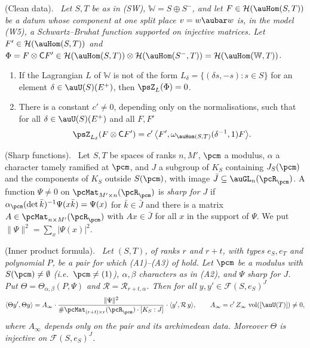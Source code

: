 \documentclass[10pt]{amsart}
\theoremstyle{definition}
\theoremstyle{remark}
\providecommand{\pcF}{\mathcal F}
\providecommand{\pcRal}{\mathcal R}
\providecommand{\pcW}{\mathbb W}
\providecommand{\pcvol}{\operatorname{vol}}
\providecommand{\psHS}{\mathcal H}
\newenvironment{quotedthm}[2]{\par\medskip\noindent\begingroup
  \textbf{#1}#2.\ \itshape\ignorespaces}{\endgroup\par\medskip}
\newenvironment{quoteddef}[2]{\par\medskip\noindent\begingroup
  \textbf{#1}#2.\ \ignorespaces}{\endgroup\par\medskip}
\begin{document}
\begin{quotedthm}{\cite[Lemma~2.14]{P53}}{ (Clean data)}
Let $S,T$ be as in \textup{(SW)}, $\pcW=S\oplus S^-$, and let $F\in\psHS(\auHom(S,T))$ be a datum
whose component at one split place $v=w\aubar w$ is, in the model \textup{(W5)}, a Schwartz--Bruhat
function supported on injective matrices. Let $F'\in\psHS(\auHom(S,T))$ and
$\Phi=F\otimes\mathsf CF'\in\psHS(\auHom(S,T))\otimes\psHS(\auHom(S^-,T))=\psHS(\auHom(\pcW,T))$.
\begin{enumerate}
\item[(a)] If the Lagrangian $L$ of $\pcW$ is not of the form $L_\delta=\{(\delta s,-s):s\in S\}$
for an element $\delta\in\auU(S)(E^+)$, then $\psZ_L(\Phi)=0$.
\item[(b)] There is a constant $c'\ne0$, depending only on the normalisations, such that for all
$\delta\in\auU(S)(E^+)$ and all $F,F'$
\[
\psZ_{L_\delta}(F\otimes\mathsf CF')=c'\,\bigl\langle F',\omega_{\auHom(S,T)}(\delta^{-1},1)F\bigr
\rangle .
\]
\end{enumerate}
\end{quotedthm}

\begin{quoteddef}{\cite[Definition~2.15]{P53}}{ (Sharp functions)}
Let $S,T$ be spaces of ranks $n,M'$, $\pcm$ a modulus, $\alpha$ a character tamely ramified at
$\pcm$, and $J$ a subgroup of $K_S$ containing $J_S(\pcm)$ and the components of $K_S$ outside
$S(\pcm)$, with image $\bar J\subseteq\auGL_n(\pcR_\pcm)$. A function $\Psi\ne0$ on
$\pcMat_{M'\times n}(\pcR_\pcm)$ is \emph{sharp for $J$} if
$\alpha_\pcm(\det\bar k)^{-1}\Psi(x\bar k)=\Psi(x)$ for $\bar k\in\bar J$ and there is a matrix
$A\in\pcMat_{n\times M'}(\pcR_\pcm)$ with $Ax\in\bar J$ for all $x$ in the support of $\Psi$. We put
$\|\Psi\|^2=\sum_x|\Psi(x)|^2$.
\end{quoteddef}

\begin{quotedthm}{\cite[Proposition~2.16]{P53}}{ (Inner product formula)}
Let $(S,T)$, of ranks $r$ and $r+t$, with types $e_S,e_T$ and polynomial $P$, be a pair for which
\textup{(A1)--(A3)} of {\cite[Lemma~2.10]{P53}} hold. Let $\pcm$ be a modulus with $S(\pcm)\ne\emptyset$ \textup(i.e.\ $\pcm\ne(1)$\textup), $\alpha,\beta$ characters
as in \textup{(A2)}, and $\Psi$ sharp for $J$. Put $\Theta=\Theta_{\alpha,\beta}(P,\Psi)$ and
$\pcRal=\pcRal_{r+t,\alpha}$. Then for all $y,y'\in\pcF(S,e_S)^J$
\[
\langle\Theta y',\Theta y\rangle=A_\infty\cdot\frac{\|\Psi\|^2}{\#\pcMat_{(r+t)\times r}(\pcR_\pcm)
\cdot[K_S:J]}\cdot\langle y',\pcRal\,y\rangle,\qquad A_\infty=c'\,Z_\infty\,\pcvol([\auU(T)])\ne0,
\]
where $A_\infty$ depends only on the pair and its archimedean data. Moreover $\Theta$ is injective
on $\pcF(S,e_S)^J$.
\end{quotedthm}
\end{document}
